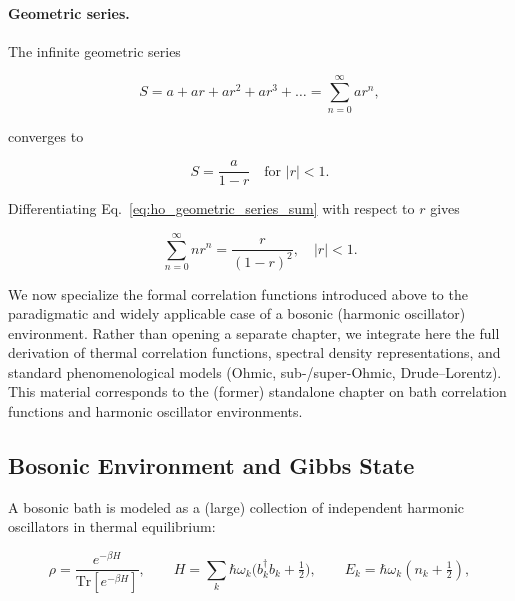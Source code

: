 \paragraph{Geometric series.}
The infinite geometric series

\begin{equation} \label{eq:ho_infinite_geometric_series}
	S = a + ar + ar^2 + ar^3 + \dots = \sum_{n=0}^{\infty} ar^n,
\end{equation}

\noindent
converges to

\begin{equation} \label{eq:ho_geometric_series_sum}
	S = \frac{a}{1-r} \quad \text{for } |r|<1.
\end{equation}

\noindent
Differentiating Eq.~\eqref{eq:ho_geometric_series_sum} with respect to $r$ gives

\begin{equation} \label{eq:ho_derivation_geometric_sum}
	\sum_{n=0}^{\infty} n r^n = \frac{r}{(1-r)^2}, \quad |r|<1.
\end{equation}



\noindent
We now specialize the formal correlation functions introduced above to the paradigmatic and widely applicable case of a bosonic (harmonic oscillator) environment. Rather than opening a separate chapter, we integrate here the full derivation of thermal correlation functions, spectral density representations, and standard phenomenological models (Ohmic, sub-/super-Ohmic, Drude--Lorentz). This material corresponds to the (former) standalone chapter on bath correlation functions and harmonic oscillator environments.


\subsection{Bosonic Environment and Gibbs State}
\label{subsec:bosonic_environment_gibbs}

\noindent
A bosonic bath is modeled as a (large) collection of independent harmonic oscillators in thermal equilibrium:

\begin{equation} \label{eq:ho_gibbs_state}
	\rho = \frac{e^{-\beta H}}{\mathrm{Tr}[e^{-\beta H}]}, \qquad H=\sum_k \hbar \omega_k \Big(b_k^{\dagger} b_k + \tfrac{1}{2}\Big), \qquad E_k = \hbar \omega_k (n_k + \tfrac{1}{2}),
\end{equation}

